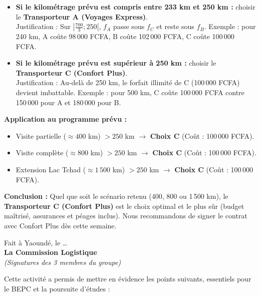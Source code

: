 \documentclass[11pt]{article}
\newcounter{popsec}
\newcounter{popsub}
\newcommand{\courssub}[1]{%
  \stepcounter{popsub}%
  \par\vspace{9pt}\noindent{\popxbold\fontsize{11.5}{13}\selectfont\color{popink}{\color{poporange}\thepopsec.\thepopsub}\hspace{6pt}#1}\par\nopagebreak\vspace{4pt}
}
\begin{document}
\begin{exoresolu}
\begin{center}
{\begin{minipage}{0.92\linewidth}
\begin{itemize}
    \item \textbf{Si le kilométrage prévu est compris entre 233 km et 250 km :} choisir le \textbf{Transporteur A (Voyages Express)}. \\
    Justification : Sur $]\frac{700}{3} ; 250[$, $f_A$ passe sous $f_C$ et reste sous $f_B$. Exemple : pour 240 km, A coûte 98\,000 FCFA, B coûte 102\,000 FCFA, C coûte 100\,000 FCFA.
    
    \item \textbf{Si le kilométrage prévu est supérieur à 250 km :} choisir le \textbf{Transporteur C (Confort Plus)}. \\
    Justification : Au-delà de 250 km, le forfait illimité de C (100\,000 FCFA) devient imbattable. Exemple : pour 500 km, C coûte 100\,000 FCFA contre 150\,000 pour A et 180\,000 pour B.
\end{itemize}

\textbf{Application au programme prévu :}
\begin{itemize}
    \item Visite partielle ($\approx 400$ km) $> 250$ km $\rightarrow$ \textbf{Choix C} (Coût : 100\,000 FCFA).
    \item Visite complète ($\approx 800$ km) $> 250$ km $\rightarrow$ \textbf{Choix C} (Coût : 100\,000 FCFA).
    \item Extension Lac Tchad ($\approx 1\,500$ km) $> 250$ km $\rightarrow$ \textbf{Choix C} (Coût : 100\,000 FCFA).
\end{itemize}

\textbf{Conclusion :} Quel que soit le scénario retenu (400, 800 ou 1\,500 km), le \textbf{Transporteur C (Confort Plus)} est le choix optimal et le plus sûr (budget maîtrisé, assurances et péages inclus). Nous recommandons de signer le contrat avec Confort Plus dès cette semaine.

\vspace{1em}
\hfill Fait à Yaoundé, le \dots\ \\
\hfill \textbf{La Commission Logistique} \\
\hfill \textit{(Signatures des 3 membres du groupe)}
\end{minipage}}
\end{center}
\end{exoresolu}

\courssub{Bilan de l'activité}
Cette activité a permis de mettre en évidence les points suivants, essentiels pour le BEPC et la poursuite d'études :
\end{document}
